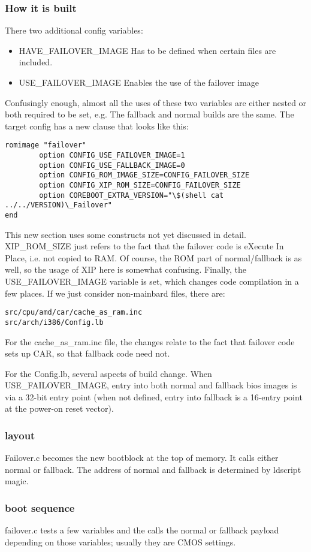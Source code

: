 \documentclass[titlepage,12pt]{article}
\begin{document}
\subsubsection{How it is built}
There two additional config variables:
\begin{itemize}
\item HAVE\_FAILOVER\_IMAGE Has to be defined when certain files are included.
\item USE\_FAILOVER\_IMAGE Enables the use of the failover image
\end{itemize}
Confusingly enough, almost all the uses of these two variables are either nested or both required to be set, e.g.
The fallback and normal builds are the same. The target config has a new clause that looks like this:
\begin{verbatim}
romimage "failover"
        option CONFIG_USE_FAILOVER_IMAGE=1
        option CONFIG_USE_FALLBACK_IMAGE=0
        option CONFIG_ROM_IMAGE_SIZE=CONFIG_FAILOVER_SIZE
        option CONFIG_XIP_ROM_SIZE=CONFIG_FAILOVER_SIZE
        option COREBOOT_EXTRA_VERSION="\$(shell cat ../../VERSION)\_Failover"
end
\end{verbatim}
This new section uses some constructs not yet discussed in detail. XIP\_ROM\_SIZE just refers to the
fact that the failover code is eXecute In Place, i.e. not copied to RAM. Of course, the ROM part of normal/fallback is as well, so the usage of XIP here is somewhat confusing. Finally, the USE\_FAILOVER\_IMAGE variable is set, which changes code compilation in a few places. If we just consider non-mainbard files, there are:
\begin{verbatim}
src/cpu/amd/car/cache_as_ram.inc
src/arch/i386/Config.lb
\end{verbatim}
For the cache\_as\_ram.inc file, the changes relate to the fact that failover code sets up CAR, so that fallback code need not.

For the Config.lb, several aspects of build change.
When USE\_FAILOVER\_IMAGE, entry into both normal and fallback bios images is via a 32-bit entry point (when not defined, entry into fallback is a 16-entry point at the power-on reset vector).
\subsubsection{layout}
Failover.c becomes the new bootblock at the top of memory. It calls either normal or fallback. The address of normal and fallback is determined by ldscript magic.
\subsubsection{boot sequence}
failover.c tests a few variables and the calls the normal or fallback payload depending on those variables; usually they are CMOS settings.
\end{document}
